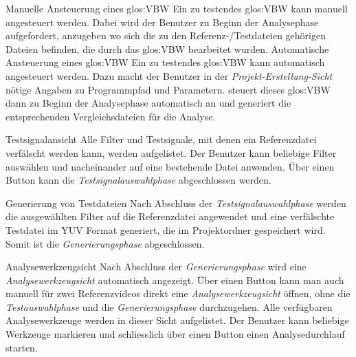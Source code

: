 \newItemPF Manuelle Ansteuerung eines \gls{glos:VBW}
\newline
Ein zu testendes \gls{glos:VBW} kann manuell angesteuert werden. Dabei wird der Benutzer zu Beginn der Analysephase aufgefordert, anzugeben wo sich die zu den Referenz-/Testdateien gehörigen Dateien befinden, die durch das \gls{glos:VBW} bearbeitet wurden.
\newItemPF Automatische Ansteuerung eines \gls{glos:VBW}
\newline
Ein zu testendes \gls{glos:VBW} kann automatisch angesteuert werden. Dazu macht der Benutzer in der \emph{Projekt-Erstellung-Sicht} nötige Angaben zu Programmpfad und Parametern. \projektTitel steuert dieses \gls{glos:VBW} dann zu Beginn der Analysephase automatisch an und generiert die entsprechenden Vergleichsdateien für die Analyse.



\newItemPF Testsignalansicht
\newline
Alle Filter und Testsignale, mit denen ein Referenzdatei verfälscht werden kann, werden aufgelistet. Der Benutzer kann beliebige Filter auswählen und nacheinander auf eine bestehende Datei anwenden. Über einen Button kann die \emph{Testsignalauswahlphase} abgeschlossen werden.

\newItemPF Generierung von Testdateien
\newline
Nach Abschluss der \emph{Testsignalauswahlphase} werden die ausgewählten Filter auf die Referenzdatei angewendet und eine verfälschte Testdatei im YUV Format generiert, die im Projektordner gespeichert wird. Somit ist die \emph{Generierungsphase} abgeschlossen.





\newItemPF Analysewerkzeugsicht
\newline
Nach Abschluss der \emph{Generierungsphase} wird eine \emph{Analysewerkzeugsicht} automatisch angezeigt. Über einen Button kann man auch manuell für zwei Referenzvideos direkt eine \emph{Analysewerkzeugsicht} öffnen, ohne die \emph{Testauswahlphase} und die \emph{Generierungsphase} durchzugehen. Alle verfügbaren Analysewerkzeuge werden in dieser Sicht aufgelistet. Der Benutzer kann beliebige Werkzeuge markieren und schliesslich über einen Button einen Analysedurchlauf starten.

